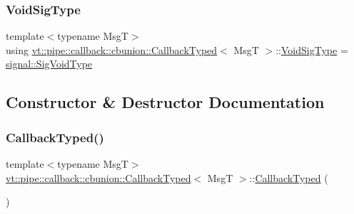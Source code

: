 \mbox{\label{structvt_1_1pipe_1_1callback_1_1cbunion_1_1_callback_typed_afeaa5f774eee46269e64e566b8239c22}} 
\subsubsection{\texorpdfstring{Void\+Sig\+Type}{VoidSigType}}
{\footnotesize\ttfamily template$<$typename MsgT$>$ \\
using \hyperlink{structvt_1_1pipe_1_1callback_1_1cbunion_1_1_callback_typed}{vt\+::pipe\+::callback\+::cbunion\+::\+Callback\+Typed}$<$ MsgT $>$\+::\hyperlink{structvt_1_1pipe_1_1callback_1_1cbunion_1_1_callback_typed_afeaa5f774eee46269e64e566b8239c22}{Void\+Sig\+Type} =  \hyperlink{namespacevt_1_1pipe_1_1signal_acbe257d1ae44f20fa9fd9b6ed3057caf}{signal\+::\+Sig\+Void\+Type}}



\subsection{Constructor \& Destructor Documentation}
\mbox{\label{structvt_1_1pipe_1_1callback_1_1cbunion_1_1_callback_typed_aa4f66e11846b531708eb4c51eaca43fc}} 
\subsubsection{\texorpdfstring{Callback\+Typed()}{CallbackTyped()}\hspace{0.1cm}{\footnotesize\ttfamily [1/14]}}
{\footnotesize\ttfamily template$<$typename MsgT$>$ \\
\hyperlink{structvt_1_1pipe_1_1callback_1_1cbunion_1_1_callback_typed}{vt\+::pipe\+::callback\+::cbunion\+::\+Callback\+Typed}$<$ MsgT $>$\+::\hyperlink{structvt_1_1pipe_1_1callback_1_1cbunion_1_1_callback_typed}{Callback\+Typed} (\begin{DoxyParamCaption}{ }\end{DoxyParamCaption})\hspace{0.3cm}{\ttfamily [default]}}

